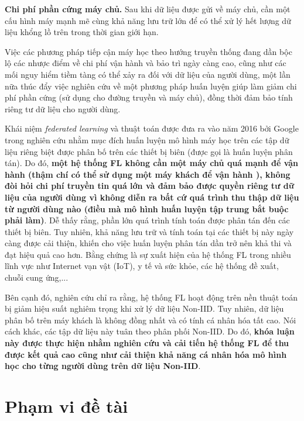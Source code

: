\textbf{Chi phí phần cứng máy chủ.} Sau khi dữ liệu được gửi về máy chủ, cần một cấu hình máy mạnh mẽ cùng khả năng lưu trữ lớn để có thể xử lý hết lượng dữ liệu khổng lồ trên trong thời gian giới hạn.

Việc các phương pháp tiếp cận máy học theo hướng truyền thống đang dần bộc lộ các nhược điểm về chi phí vận hành và bảo trì ngày càng cao, cũng như các mối nguy hiểm tiềm tàng có thể xảy ra đối với dữ liệu của người dùng, một lần nữa thúc đẩy việc nghiên cứu về một phương pháp huấn luyện giúp làm giảm chi phí phần cứng (sử dụng cho đường truyền và máy chủ), đồng thời đảm bảo tính riêng tư dữ liệu cho người dùng.

Khái niệm \textit{federated learning} và thuật toán  được đưa ra vào năm 2016 bởi Google trong nghiên cứu \cite{mcmahan2017communication} nhằm mục đích huấn luyện mô hình máy học trên các tập dữ liệu riêng biệt được phân bố trên các thiết bị biên (được gọi là huấn luyện phân tán). Do đó, \textbf{một hệ thống FL không cần một máy chủ quá mạnh để vận hành (thậm chí có thể sử dụng một máy khách để vận hành \cite{yin2021comprehensive}), không đòi hỏi chi phí truyền tin quá lớn và đảm bảo được quyền riêng tư dữ liệu của người dùng vì không diễn ra bất cứ quá trình thu thập dữ liệu từ người dùng nào (điều mà mô hình huấn luyện tập trung bắt buộc phải làm)}. Dễ thấy rằng, phần lớn quá trình tính toán được phân tán đến các thiết bị biên. Tuy nhiên, khả năng lưu trữ và tính toán tại các thiết bị này ngày càng được cải thiện, khiến cho việc huấn luyện phân tán dần trở nên khả thi và đạt hiệu quả cao hơn. Bằng chứng là sự xuất hiện của hệ thống FL trong nhiều lĩnh vực như Internet vạn vật (IoT), y tế và sức khỏe, các hệ thống đề xuất, chuỗi cung ứng,... \cite{zhou2021survey}

Bên cạnh đó, nghiên cứu \cite{zhao2018federated} chỉ ra rằng, hệ thống FL hoạt động trên nền thuật toán  bị giảm hiệu suất nghiêm trọng khi xử lý dữ liệu Non-IID. Tuy nhiên, dữ liệu phân bố trên máy khách là không đồng nhất và có tính cá nhân hóa tất cao. Nói cách khác, các tập dữ liệu này tuân theo phân phối Non-IID. Do đó, \textbf{khóa luận này được thực hiện nhằm nghiên cứu và cải tiến hệ thống FL để thu được kết quả cao cũng như cải thiện khả năng cá nhân hóa mô hình học cho từng người dùng trên dữ liệu Non-IID}.

\section{Phạm vi đề tài}

